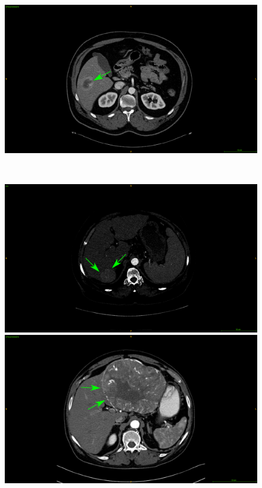 {\begin{figure}[!ht]
\begin{mdframed}[backgroundcolor=blue!50,linecolor=blue!50]
\begin{minipage}{0.45\linewidth}
			\includegraphics[width=\linewidth]{images/ImagingTraits/TCIA_peritumoralEnhancement}
		\end{minipage} \\
		\begin{minipage}{0.45\linewidth}
			\includegraphics[width=\linewidth]{images/ImagingTraits/GDB_smoothMargins}
		\end{minipage} \hspace{-0.1cm}
		\begin{minipage}{0.45\linewidth}
			\includegraphics[width=\linewidth]{images/ImagingTraits/TCIA_smoothMargins}

\end{minipage}
\end{mdframed}
\end{figure}}
